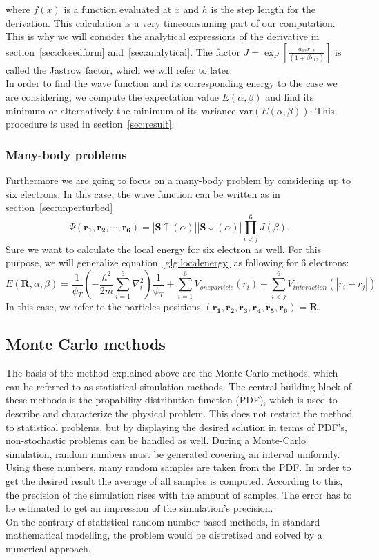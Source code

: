 where $f(x)$ is a function evaluated at $x$ and $h$ is the step length for the derivation. This calculation is a very timeconsuming part of our computation. This is why we will consider the analytical expressions of the derivative in section~\ref{sec:closedform} and~\ref{sec:analytical}.
The factor $J = \exp \left[ \frac{a_{12} r_{12}}{(1+\beta r_{12})} \right]$ is called the Jastrow factor, which we will refer to later.\\
In order to find the wave function and its corresponding energy to the case we are considering, we compute the expectation value $E(\alpha, \beta)$ and find its minimum or alternatively the minimum of its variance $\mathrm{var}(E(\alpha, \beta))$. This procedure is used in section~\ref{sec:result}.
\subsubsection{Many-body problems}
Furthermore we are going to focus on a many-body problem by considering up to six electrons. In this case, the wave function can be written as in section~\ref{sec:unperturbed}
\begin{equation}\label{sixelectron}
\Psi(\mathbf{r_1,r_2,\cdots, r_6})= |\mathbf{S\uparrow}(\alpha)||\mathbf{S\downarrow}(\alpha)|\prod_{i<j}^6 J(\beta).
\end{equation}
Sure we want to calculate the local energy for six electron as well. For this purpose, we will generalize equation~\ref{glg:localenergy} as following for $6$ electrons:
\begin{equation}
E(\mathbf{R},\alpha,\beta) = \frac{1}{\psi_T} \left(-\frac{\hbar^2}{2m}\sum_{i=1}^6 \nabla^2_i\right) \frac{1}{\psi_T} + \sum_{i=1}^6 V_{oneparticle}(r_i) + \sum_{i<j}^6 V_{interaction}(|r_i-r_j|)
\end{equation}
In this case, we refer to the particles positions $(\mathbf{r_1,r_2,r_3,r_4,r_5,r_6})=\mathbf{R}$.
\subsection{Monte Carlo methods}
The basis of the method explained above are the Monte Carlo methods, which can be referred to as statistical simulation methods. The central building block of these methods is the propability distribution function (PDF), which is used to describe and characterize the physical problem. This does not restrict the method to statistical problems, but by displaying the desired solution in terms of PDF's, non-stochastic problems can be handled as well. During a Monte-Carlo simulation, random numbers must be generated covering an interval uniformly. Using these numbers, many random samples are taken from the PDF. In order to get the desired result the average of all samples is computed. According to this, the precision of the simulation rises with the amount of samples. The error has to be estimated to get an impression of the simulation's precision.\\
On the contrary of statistical random number-based methods, in standard mathematical modelling, the problem would be distretized and solved by a numerical approach.\\
